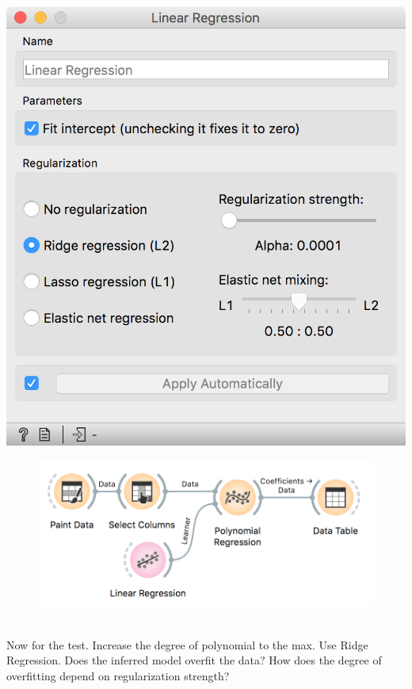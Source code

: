 \begin{marginfigure}
    \centering
    \includegraphics[scale=0.4]{lin-reg-ridge.png}
    \caption{$\;$}
\end{marginfigure}

\begin{figure}[h]
    \centering
    \includegraphics[scale=0.6]{workflow-ridge.png}
    \caption{$\;$}
\end{figure}

Now for the test. Increase the degree of polynomial to the max. Use Ridge Regression. Does the inferred model overfit the data? How does the degree of overfitting depend on regularization strength?
